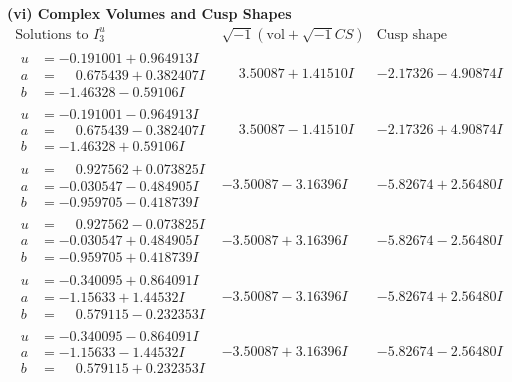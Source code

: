 \documentclass[1p]{elsarticle_modified}
\theoremstyle{definition}
\newcommand{\I}{\sqrt{-1}}
\begin{document}
\newpage\flushleft \textbf{(vi) Complex Volumes and Cusp Shapes}
$$\begin{array}{c|c|c}  
\text{Solutions to }I^u_{3}& \I (\text{vol} + \sqrt{-1}CS) & \text{Cusp shape}\\
 \hline 
\begin{aligned}
u &= -0.191001 + 0.964913 I \\
a &= \phantom{-}0.675439 + 0.382407 I \\
b &= -1.46328 - 0.59106 I\end{aligned}
 & \phantom{-}3.50087 + 1.41510 I & -2.17326 - 4.90874 I \\ \hline\begin{aligned}
u &= -0.191001 - 0.964913 I \\
a &= \phantom{-}0.675439 - 0.382407 I \\
b &= -1.46328 + 0.59106 I\end{aligned}
 & \phantom{-}3.50087 - 1.41510 I & -2.17326 + 4.90874 I \\ \hline\begin{aligned}
u &= \phantom{-}0.927562 + 0.073825 I \\
a &= -0.030547 - 0.484905 I \\
b &= -0.959705 - 0.418739 I\end{aligned}
 & -3.50087 - 3.16396 I & -5.82674 + 2.56480 I \\ \hline\begin{aligned}
u &= \phantom{-}0.927562 - 0.073825 I \\
a &= -0.030547 + 0.484905 I \\
b &= -0.959705 + 0.418739 I\end{aligned}
 & -3.50087 + 3.16396 I & -5.82674 - 2.56480 I \\ \hline\begin{aligned}
u &= -0.340095 + 0.864091 I \\
a &= -1.15633 + 1.44532 I \\
b &= \phantom{-}0.579115 - 0.232353 I\end{aligned}
 & -3.50087 - 3.16396 I & -5.82674 + 2.56480 I \\ \hline\begin{aligned}
u &= -0.340095 - 0.864091 I \\
a &= -1.15633 - 1.44532 I \\
b &= \phantom{-}0.579115 + 0.232353 I\end{aligned}
 & -3.50087 + 3.16396 I & -5.82674 - 2.56480 I \\ \hline\begin{aligned}

\end{aligned}
\end{array}$$
\end{document}
